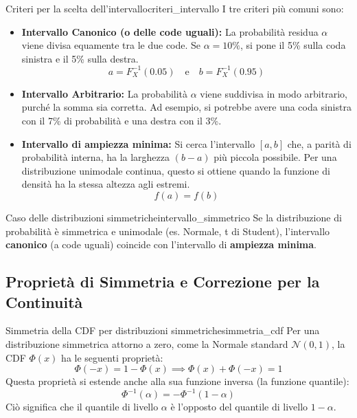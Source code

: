 \begin{nota}{Criteri per la scelta dell'intervallo}{criteri_intervallo}
I tre criteri più comuni sono:
\begin{itemize}
    \item \textbf{Intervallo Canonico (o delle code uguali):} La probabilità residua \( \alpha \) viene divisa equamente tra le due code. Se \( \alpha = 10\% \), si pone il 5\% sulla coda sinistra e il 5\% sulla destra.
    \[
    a = F_X^{-1}(0.05) \quad \text{e} \quad b = F_X^{-1}(0.95)
    \]
    \item \textbf{Intervallo Arbitrario:} La probabilità \( \alpha \) viene suddivisa in modo arbitrario, purché la somma sia corretta. Ad esempio, si potrebbe avere una coda sinistra con il 7\% di probabilità e una destra con il 3\%.
    \item \textbf{Intervallo di ampiezza minima:} Si cerca l'intervallo \( [a, b] \) che, a parità di probabilità interna, ha la larghezza \( (b-a) \) più piccola possibile. Per una distribuzione unimodale continua, questo si ottiene quando la funzione di densità ha la stessa altezza agli estremi.
    \[
    f(a) = f(b)
    \]
\end{itemize}
\end{nota}

\begin{nota}{Caso delle distribuzioni simmetriche}{intervallo_simmetrico}
Se la distribuzione di probabilità è simmetrica e unimodale (es. Normale, t di Student), l'intervallo \textbf{canonico} (a code uguali) coincide con l'intervallo di \textbf{ampiezza minima}.
\end{nota}

\subsection{Proprietà di Simmetria e Correzione per la Continuità}

\begin{nota}{Simmetria della CDF per distribuzioni simmetriche}{simmetria_cdf}
Per una distribuzione simmetrica attorno a zero, come la Normale standard \( \mathcal{N}(0,1) \), la CDF \( \Phi(x) \) ha le seguenti proprietà:
\[
\Phi(-x) = 1 - \Phi(x) \implies \Phi(x) + \Phi(-x) = 1
\]
Questa proprietà si estende anche alla sua funzione inversa (la funzione quantile):
\[
\Phi^{-1}(\alpha) = - \Phi^{-1}(1-\alpha)
\]
Ciò significa che il quantile di livello \( \alpha \) è l'opposto del quantile di livello \( 1-\alpha \).
\end{nota}

